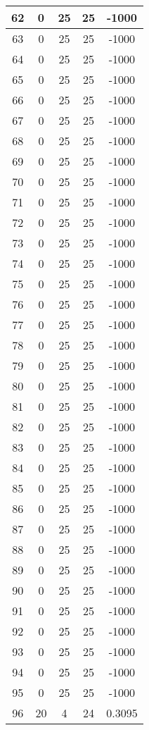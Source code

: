 \documentclass[letterpaper, 12pt]{article}
\begin{document}
\begin{longtable}{|c|c|c|c|c|}
\hline
62 & 0 & 25 & 25 & -1000 \\
\hline
63 & 0 & 25 & 25 & -1000 \\
\hline
64 & 0 & 25 & 25 & -1000 \\
\hline
65 & 0 & 25 & 25 & -1000 \\
\hline
66 & 0 & 25 & 25 & -1000 \\
\hline
67 & 0 & 25 & 25 & -1000 \\
\hline
68 & 0 & 25 & 25 & -1000 \\
\hline
69 & 0 & 25 & 25 & -1000 \\
\hline
70 & 0 & 25 & 25 & -1000 \\
\hline
71 & 0 & 25 & 25 & -1000 \\
\hline
72 & 0 & 25 & 25 & -1000 \\
\hline
73 & 0 & 25 & 25 & -1000 \\
\hline
74 & 0 & 25 & 25 & -1000 \\
\hline
75 & 0 & 25 & 25 & -1000 \\
\hline
76 & 0 & 25 & 25 & -1000 \\
\hline
77 & 0 & 25 & 25 & -1000 \\
\hline
78 & 0 & 25 & 25 & -1000 \\
\hline
79 & 0 & 25 & 25 & -1000 \\
\hline
80 & 0 & 25 & 25 & -1000 \\
\hline
81 & 0 & 25 & 25 & -1000 \\
\hline
82 & 0 & 25 & 25 & -1000 \\
\hline
83 & 0 & 25 & 25 & -1000 \\
\hline
84 & 0 & 25 & 25 & -1000 \\
\hline
85 & 0 & 25 & 25 & -1000 \\
\hline
86 & 0 & 25 & 25 & -1000 \\
\hline
87 & 0 & 25 & 25 & -1000 \\
\hline
88 & 0 & 25 & 25 & -1000 \\
\hline
89 & 0 & 25 & 25 & -1000 \\
\hline
90 & 0 & 25 & 25 & -1000 \\
\hline
91 & 0 & 25 & 25 & -1000 \\
\hline
92 & 0 & 25 & 25 & -1000 \\
\hline
93 & 0 & 25 & 25 & -1000 \\
\hline
94 & 0 & 25 & 25 & -1000 \\
\hline
95 & 0 & 25 & 25 & -1000 \\
\hline
96 & 20 & 4 & 24 & 0.3095 \\

\end{longtable}
\end{document}
